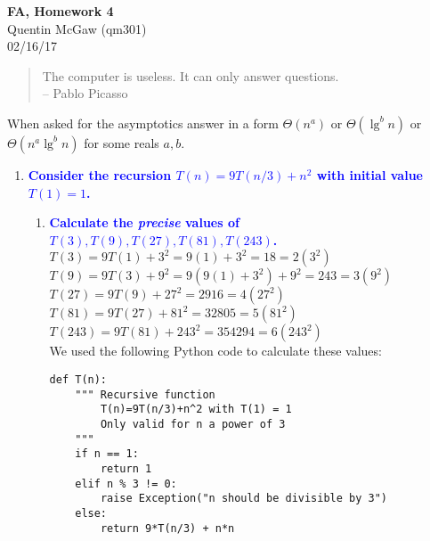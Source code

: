 \documentclass[11pt]{article}
\begin{document}
\begin{center} {\Large\bf FA, Homework 4}  \\ Quentin McGaw (qm301) \\ 02/16/17
\end{center}

\begin{quote}
The computer is useless. It can only answer questions.  \\ -- Pablo Picasso
\end{quote}

When asked for the asymptotics answer in a form $\Theta(n^a)$ or $\Theta(\lg^bn)$ or $\Theta(n^a\lg^bn)$ for some reals $a,b$.

\begin{enumerate}
\item \textbf{\textcolor{blue}{Consider the recursion $T(n)=9T(n/3) + n^2$ with initial value $T(1)=1$.}}
    \begin{enumerate}
    \item \textbf{\textcolor{blue}{Calculate the {\em precise} values of $T(3),T(9),T(27),T(81),T(243)$.}}
        \\ $T(3) = 9T(1) + 3^2 = 9(1) + 3^2 = 18 = 2(3^2)$
        \\ $T(9) = 9T(3) + 9^2 = 9(9(1) + 3^2) + 9^2 = 243 = 3(9^2)$
        \\ $T(27) = 9T(9) + 27^2 = 2916 = 4(27^2)$
        \\ $T(81) = 9T(27) + 81^2 = 32805 = 5(81^2)$
        \\ $T(243) = 9T(81) + 243^2 = 354294 = 6(243^2)$
        \\ We used the following Python code to calculate these values:
        \begin{verbatim}
def T(n):
    """ Recursive function 
        T(n)=9T(n/3)+n^2 with T(1) = 1
        Only valid for n a power of 3
    """
    if n == 1:
        return 1
    elif n % 3 != 0:
        raise Exception("n should be divisible by 3")
    else:
        return 9*T(n/3) + n*n


\end{verbatim}
\end{enumerate}
\end{enumerate}
\end{document}

